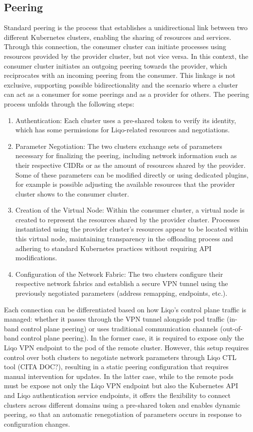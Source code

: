 \subsection{Peering}
Standard peering is the process that establishes a unidirectional link between two different Kubernetes clusters, enabling the sharing of resources and services. Through this connection, the consumer cluster can initiate processes using resources provided by the provider cluster, but not vice versa. In this context, the consumer cluster initiates an outgoing peering towards the provider, which reciprocates with an incoming peering from the consumer. This linkage is not exclusive, supporting possible bidirectionality and the scenario where a cluster can act as a consumer for some peerings and as a provider for others.
The peering process unfolds through the following steps:
\begin{enumerate}
\item Authentication: Each cluster uses a pre-shared token to verify its identity, which has some permissions for Liqo-related resources and negotiations.
\item Parameter Negotiation: The two clusters exchange sets of parameters necessary for finalizing the peering, including network information such as their respective CIDRs or as the amount of resources shared by the provider. Some of these parameters can be modified directly or using dedicated plugins, for example is possible adjusting the available resources that the provider cluster shows to the consumer cluster.
\item Creation of the Virtual Node: Within the consumer cluster, a virtual node is created to represent the resources shared by the provider cluster. Processes instantiated using the provider cluster's resources appear to be located within this virtual node, maintaining transparency in the offloading process and adhering to standard Kubernetes practices without requiring API modifications.
\item Configuration of the Network Fabric: The two clusters configure their respective network fabrics and establish a secure VPN tunnel using the previously negotiated parameters (address remapping, endpoints, etc.).
\end{enumerate}
Each connection can be differentiated based on how Liqo's control plane traffic is managed: whether it passes through the VPN tunnel alongside pod traffic (in-band control plane peering) or uses traditional communication channels (out-of-band control plane peering). In the former case, it is required to expose only the Liqo VPN endpoint to the pod of the remote cluster. However, this setup requires control over both clusters to negotiate network parameters through Liqo CTL tool (CITA DOC?), resulting in a static peering configuration that requires manual intervention for updates. In the latter case, while to the remote pods must be expose not only the Liqo VPN endpoint but also the Kubernetes API and Liqo authentication service endpoints, it offers the flexibility to connect clusters across different domains using a pre-shared token and enables dynamic peering, so that an automatic renegotiation of parameters occurs in response to configuration changes. 


